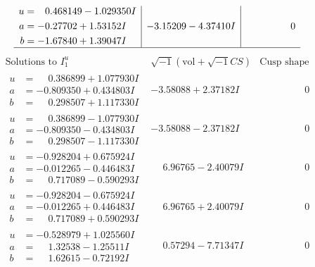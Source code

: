 \documentclass[1p]{elsarticle_modified}
\theoremstyle{definition}
\newcommand{\I}{\sqrt{-1}}
\begin{document}
$$\begin{array}{c|c|c}
\begin{aligned}
u &= \phantom{-}0.468149 - 1.029350 I \\
a &= -0.27702 + 1.53152 I \\
b &= -1.67840 + 1.39047 I\end{aligned}
 & -3.15209 - 4.37410 I & \phantom{-0.000000 } 0\\
 \hline 
 \end{array}$$\newpage$$\begin{array}{c|c|c}  
\text{Solutions to }I^u_{1}& \I (\text{vol} + \sqrt{-1}CS) & \text{Cusp shape}\\
 \hline 
\begin{aligned}
u &= \phantom{-}0.386899 + 1.077930 I \\
a &= -0.809350 + 0.434803 I \\
b &= \phantom{-}0.298507 + 1.117330 I\end{aligned}
 & -3.58088 + 2.37182 I & \phantom{-0.000000 } 0 \\ \hline\begin{aligned}
u &= \phantom{-}0.386899 - 1.077930 I \\
a &= -0.809350 - 0.434803 I \\
b &= \phantom{-}0.298507 - 1.117330 I\end{aligned}
 & -3.58088 - 2.37182 I & \phantom{-0.000000 } 0 \\ \hline\begin{aligned}
u &= -0.928204 + 0.675924 I \\
a &= -0.012265 - 0.446483 I \\
b &= \phantom{-}0.717089 - 0.590293 I\end{aligned}
 & \phantom{-}6.96765 - 2.40079 I & \phantom{-0.000000 } 0 \\ \hline\begin{aligned}
u &= -0.928204 - 0.675924 I \\
a &= -0.012265 + 0.446483 I \\
b &= \phantom{-}0.717089 + 0.590293 I\end{aligned}
 & \phantom{-}6.96765 + 2.40079 I & \phantom{-0.000000 } 0 \\ \hline\begin{aligned}
u &= -0.528979 + 1.025560 I \\
a &= \phantom{-}1.32538 - 1.25511 I \\
b &= \phantom{-}1.62615 - 0.72192 I\end{aligned}
 & \phantom{-}0.57294 - 7.71347 I & \phantom{-0.000000 } 0 \\ \hline\begin{aligned}

\end{aligned}
\end{array}$$
\end{document}
